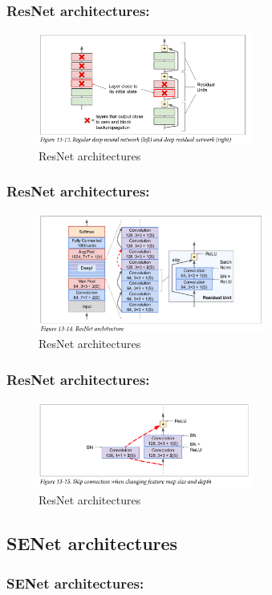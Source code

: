 \documentclass{beamer}
\begin{document}
    \begin{frame}
    \frametitle{ResNet architectures: }
         \begin{figure}[H]
            \begin{center}
                \includegraphics[width=7cm]{FIGURE13-5.png}
            \end{center}
        \caption{ResNet architectures}
        \end{figure}
    \end{frame}

    \begin{frame}
    \frametitle{ResNet architectures: }
         \begin{figure}[H]
            \begin{center}
                \includegraphics[width=7.5cm]{FIGURE13-6.png}
            \end{center}
        \caption{ResNet architectures}
        \end{figure}
    \end{frame}

    \begin{frame}
    \frametitle{ResNet architectures: }
         \begin{figure}[H]
            \begin{center}
                \includegraphics[width=7cm]{FIGURE13-7.png}
            \end{center}
        \caption{ResNet architectures}
        \end{figure}
    \end{frame}

\subsection{SENet architectures}
    \begin{frame}
    \frametitle{SENet architectures: }
    \end{frame}

   \begin{frame}
   \end{frame}
\end{document}
